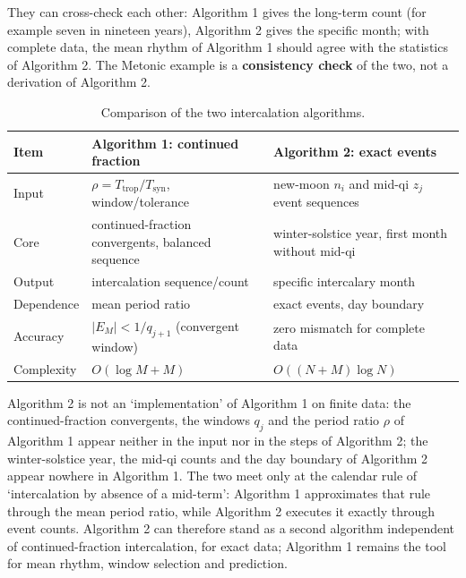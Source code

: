 They can cross-check each other: Algorithm 1 gives the long-term count (for example seven in nineteen years), Algorithm 2 gives the specific month; with complete data, the mean rhythm of Algorithm 1 should agree with the statistics of Algorithm 2. The Metonic example is a \textbf{consistency check} of the two, not a derivation of Algorithm 2.

\begin{table}[htbp]
\centering
\small
\caption{Comparison of the two intercalation algorithms.}
\label{tab:two_intercalation_algorithms}
\begin{tabular}{@{}>{\raggedright\arraybackslash}p{2.6cm}>{\raggedright\arraybackslash}p{4.9cm}>{\raggedright\arraybackslash}p{4.9cm}@{}}
\toprule
Item & Algorithm 1: continued fraction & Algorithm 2: exact events \\
\midrule
Input & \(\rho=T_{\text{trop}}/T_{\text{syn}}\), window/tolerance & new-moon \(n_i\) and mid-qi \(z_j\) event sequences \\
Core & continued-fraction convergents, balanced sequence & winter-solstice year, first month without mid-qi \\
Output & intercalation sequence/count & specific intercalary month \\
Dependence & mean period ratio & exact events, day boundary \\
Accuracy & \(|E_M|<1/q_{j+1}\) (convergent window) & zero mismatch for complete data \\
Complexity & \(O(\log M+M)\) & \(O((N+M)\log N)\) \\
\bottomrule
\end{tabular}
\end{table}

\begin{remark}[Independence]
\label{rem:two_algorithms_independent}
Algorithm 2 is not an `implementation' of Algorithm 1 on finite data: the continued-fraction convergents, the windows \(q_j\) and the period ratio \(\rho\) of Algorithm 1 appear neither in the input nor in the steps of Algorithm 2; the winter-solstice year, the mid-qi counts and the day boundary of Algorithm 2 appear nowhere in Algorithm 1. The two meet only at the calendar rule of `intercalation by absence of a mid-term': Algorithm 1 approximates that rule through the mean period ratio, while Algorithm 2 executes it exactly through event counts. Algorithm 2 can therefore stand as a second algorithm independent of continued-fraction intercalation, for exact data; Algorithm 1 remains the tool for mean rhythm, window selection and prediction.
\end{remark}

